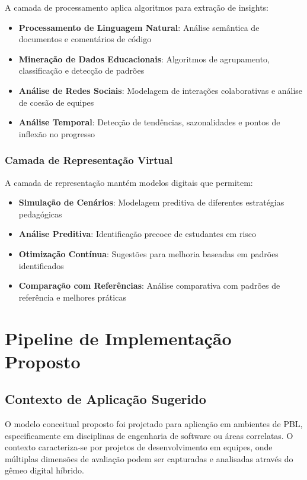 \documentclass[english, spanish, brazilian]{modelo_dt}
\begin{document}
A camada de processamento aplica algoritmos para extração de insights:
\begin{itemize}
\item \textbf{Processamento de Linguagem Natural}: Análise semântica de documentos e comentários de código
\item \textbf{Mineração de Dados Educacionais}: Algoritmos de agrupamento, classificação e detecção de padrões
\item \textbf{Análise de Redes Sociais}: Modelagem de interações colaborativas e análise de coesão de equipes
\item \textbf{Análise Temporal}: Detecção de tendências, sazonalidades e pontos de inflexão no progresso
\end{itemize}

\subsubsection{Camada de Representação Virtual}

A camada de representação mantém modelos digitais que permitem:
\begin{itemize}
\item \textbf{Simulação de Cenários}: Modelagem preditiva de diferentes estratégias pedagógicas
\item \textbf{Análise Preditiva}: Identificação precoce de estudantes em risco
\item \textbf{Otimização Contínua}: Sugestões para melhoria baseadas em padrões identificados
\item \textbf{Comparação com Referências}: Análise comparativa com padrões de referência e melhores práticas
\end{itemize}

\section{Pipeline de Implementação Proposto}

\subsection{Contexto de Aplicação Sugerido}

O modelo conceitual proposto foi projetado para aplicação em ambientes de PBL, especificamente em disciplinas de engenharia de software ou áreas correlatas. O contexto caracteriza-se por projetos de desenvolvimento em equipes, onde múltiplas dimensões de avaliação podem ser capturadas e analisadas através do gêmeo digital híbrido.
\end{document}
